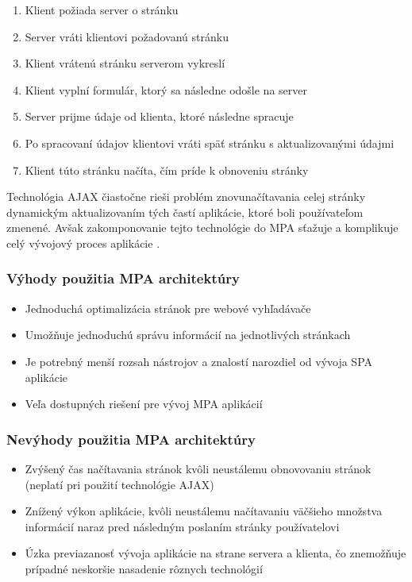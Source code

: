 \begin{enumerate}
	\item Klient požiada server o stránku
	\item Server vráti klientovi požadovanú stránku
	\item Klient vrátenú stránku serverom vykreslí
	\item Klient vyplní formulár, ktorý sa následne odošle na server
	\item Server prijme údaje od klienta, ktoré následne spracuje
	\item Po spracovaní údajov klientovi vráti späť stránku s aktualizovanými údajmi
	\item Klient túto stránku načíta, čím príde k obnoveniu stránky
\end{enumerate}

Technológia AJAX čiastočne rieši problém znovunačítavania celej stránky dynamickým aktualizovaním tých častí aplikácie, ktoré boli používateľom zmenené. Avšak zakomponovanie tejto technológie do MPA sťažuje a komplikuje celý vývojový proces aplikácie \cite{mpa-architektura}.

\subsubsection*{Výhody použitia MPA architektúry}

\begin{itemize}
	\item Jednoduchá optimalizácia stránok pre webové vyhľadávače \cite{spa-vs-mpa-1}
	\item Umožňuje jednoduchú správu informácií na jednotlivých stránkach \cite{spa-vs-mpa-3}
	\item Je potrebný menší rozsah nástrojov a znalostí narozdiel od vývoja SPA aplikácie \cite{spa-vs-mpa-2}
	\item Veľa dostupných riešení pre vývoj MPA aplikácií \cite{spa-vs-mpa-2}
\end{itemize}


\subsubsection*{Nevýhody použitia MPA architektúry}

\begin{itemize}
	\item Zvýšený čas načítavania stránok kvôli neustálemu obnovovaniu stránok (neplatí pri použití technológie AJAX) \cite{spa-vs-mpa-1}
	\item Znížený výkon aplikácie, kvôli neustálemu načítavaniu väčšieho množstva informácií naraz pred následným poslaním stránky používatelovi \cite{spa-vs-mpa-1}
	\item Úzka previazanosť vývoja aplikácie na strane servera a klienta, čo znemožňuje prípadné neskoršie nasadenie rôznych technológií \cite{spa-vs-mpa-2}
\end{itemize}


